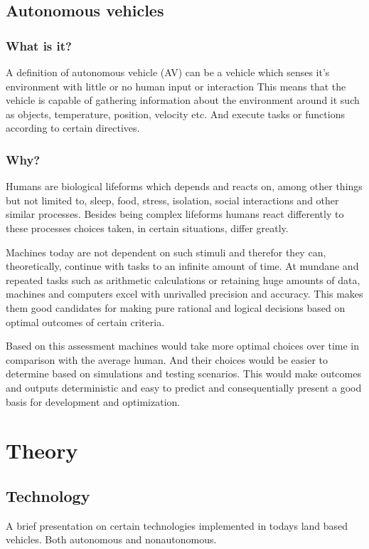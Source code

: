 \documentclass[conference]{IEEEtran}
\begin{document}
 \subsection{Autonomous vehicles}
	 \subsubsection{What is it?}
		 A definition of autonomous vehicle (AV) can be a vehicle which senses it's environment with little or no human input or interaction
		 This means that the vehicle is capable of gathering information about the environment around it such as objects, temperature, position, velocity etc. And
		 execute tasks or functions according to certain directives.
	 \subsubsection{Why?}
		 Humans are biological lifeforms which depends and reacts on, among other things but not limited to, sleep, food,
		 stress, isolation, social interactions and other similar processes. Besides being complex lifeforms
		 humans react differently to these processes choices taken, in certain situations, differ greatly.

		 Machines today are not dependent on such stimuli and therefor they can, theoretically, continue with tasks to an
		 infinite amount of time. At mundane and repeated tasks such as arithmetic calculations or retaining huge amounts of data,
		 machines and computers excel with unrivalled precision and accuracy. This makes them good candidates for making
		 pure rational and logical decisions based on optimal outcomes of certain criteria.

		 Based on this assessment machines would take more optimal choices over time in comparison with the average human.
		 And their choices would be easier to determine based on simulations and testing scenarios.
		 This would make outcomes and outputs deterministic and easy to predict and consequentially present a good
		 basis for development and optimization.

\section{Theory}
 \subsection{Technology}
	 A brief presentation on certain technologies implemented in todays land based vehicles. Both autonomous
	 and nonautonomous.
\end{document}
